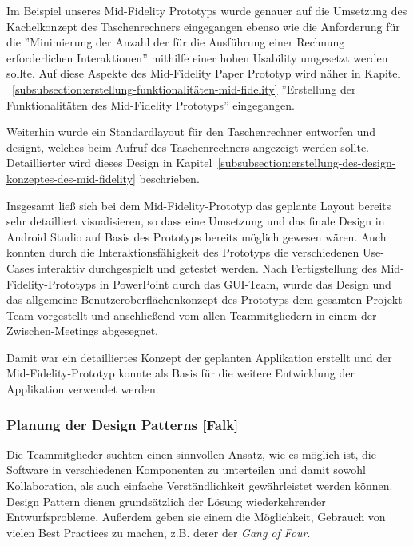 
Im Beispiel unseres Mid-Fidelity Prototyps wurde genauer auf die Umsetzung des Kachelkonzept des Taschenrechners eingegangen ebenso wie die Anforderung für die ''Minimierung der Anzahl der für die Ausführung einer Rechnung erforderlichen Interaktionen'' mithilfe einer hohen Usability umgesetzt werden sollte. Auf diese Aspekte des Mid-Fidelity Paper Prototyp wird näher in Kapitel ~\ref{subsubsection:erstellung-funktionalitäten-mid-fidelity} ''Erstellung der Funktionalitäten des Mid-Fidelity Prototyps'' eingegangen. 

Weiterhin wurde ein Standardlayout für den Taschenrechner entworfen und designt, welches beim Aufruf des Taschenrechners angezeigt werden sollte. Detaillierter wird dieses Design in Kapitel~\ref{subsubsection:erstellung-des-design-konzeptes-des-mid-fidelity} beschrieben. 

Insgesamt ließ sich bei dem Mid-Fidelity-Prototyp das geplante Layout bereits sehr detailliert visualisieren, so dass eine Umsetzung und das finale Design in Android Studio auf Basis des Prototyps bereits möglich gewesen wären. Auch konnten durch die Interaktionsfähigkeit des Prototyps die verschiedenen Use-Cases interaktiv durchgespielt und getestet werden. Nach Fertigstellung des Mid-Fidelity-Prototyps in PowerPoint durch das GUI-Team, wurde das Design und das allgemeine Benutzeroberflächenkonzept des Prototyps dem gesamten Projekt-Team vorgestellt und anschließend vom allen Teammitgliedern in einem der Zwischen-Meetings abgesegnet. 

Damit war ein detailliertes Konzept der geplanten Applikation erstellt und der Mid-Fidelity-Prototyp konnte als Basis für die weitere Entwicklung der Applikation verwendet werden. 

\clearpage

\subsubsection{Planung der Design Patterns [Falk]}

Die Teammitglieder suchten einen sinnvollen Ansatz, wie es möglich ist, die Software in verschiedenen Komponenten zu unterteilen und damit sowohl Kollaboration, als auch einfache Verständlichkeit gewährleistet werden können. Design Pattern dienen grundsätzlich der Lösung wiederkehrender Entwurfsprobleme. Außerdem geben sie einem die Möglichkeit, Gebrauch von vielen Best Practices zu machen, z.B. derer der \textit{Gang of Four}. 

